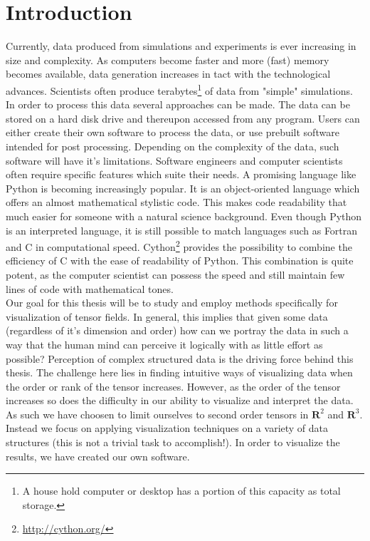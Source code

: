 \documentclass[main.tex]{subfiles}
\begin{document}
\section{Introduction}
\label{sec:1}

Currently, data produced from simulations and experiments is ever increasing 
in size and complexity. As computers become faster and more 
(fast) memory becomes available, data generation increases in tact with the technological 
advances. Scientists often produce terabytes\footnote{A house hold computer or desktop has a 
portion of this capacity as total storage.} of data from "simple" simulations. In order to process 
this data several approaches can be made. The data can be stored on a hard disk drive and 
thereupon accessed from any program. Users can either create their own software to process 
the data, or use prebuilt software intended for post processing. Depending on the complexity of the data, 
such software will have it's limitations. Software engineers and computer scientists often require 
specific features which suite their needs. A promising language like Python is becoming increasingly popular. 
It is an object-oriented language which offers an almost mathematical stylistic code. This
makes code readability that much easier for someone with a natural science background. 
Even though Python is an interpreted language, it is still possible to match languages such 
as Fortran and C in computational speed. Cython\footnote{\url{http://cython.org/}} provides the 
possibility to combine the efficiency of C with the ease of readability of Python. This combination 
is quite potent, as the computer scientist can possess the speed and still maintain few lines 
of code with mathematical tones.
\\

Our goal for this thesis will be to study and employ 
methods specifically for visualization of tensor fields. In general, this implies that given some 
data (regardless of it's dimension and order) how can we portray the data in such a way that 
the human mind can perceive it logically with as little effort as possible? Perception of complex 
structured data is the driving force behind this thesis. The challenge here lies in finding intuitive 
ways of visualizing data when the order or rank of the tensor increases. However, as the order of the tensor
increases so does the difficulty in our ability to visualize and interpret the data. As such we have 
choosen to limit ourselves to second order tensors in $\mathbf{R}^2$ and $\mathbf{R}^3$. 
Instead we focus on applying visualization techniques on a variety of data structures (this is not a trivial 
task to accomplish!). In order to visualize the results, we have created our own software.
\\
\end{document}
